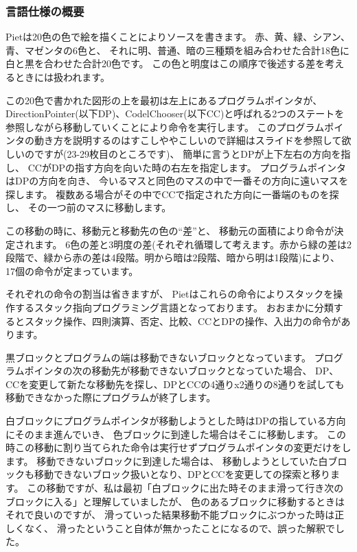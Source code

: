 \subsubsection{言語仕様の概要}

Pietは20色の色で絵を描くことによりソースを書きます。
赤、黄、緑、シアン、青、マゼンタの6色と、
それに明、普通、暗の三種類を組み合わせた合計18色に白と黒を合わせた合計20色です。
この色と明度はこの順序で後述する差を考えるときには扱われます。

この20色で書かれた図形の上を最初は左上にあるプログラムポインタが、
DirectionPointer(以下DP)、CodelChooser(以下CC)と呼ばれる2つのステートを参照しながら移動していくことにより命令を実行します。
このプログラムポインタの動き方を説明するのはすこしややこしいので詳細はスライドを参照して欲しいのですが(23-29枚目のところです)、
簡単に言うとDPが上下左右の方向を指し、
CCがDPの指す方向を向いた時の右左を指定します。
プログラムポインタはDPの方向を向き、
今いるマスと同色のマスの中で一番その方向に遠いマスを探します。
複数ある場合がその中でCCで指定された方向に一番端のものを探し、
その一つ前のマスに移動します。

この移動の時に、移動元と移動先の色の``差''と、
移動元の面積により命令が決定されます。
6色の差と3明度の差(それぞれ循環して考えます。赤から緑の差は2段階で、緑から赤の差は4段階。明から暗は2段階、暗から明は1段階)により、
17個の命令が定まっています。

それぞれの命令の割当は省きますが、
Pietはこれらの命令によりスタックを操作するスタック指向プログラミング言語となっております。
おおまかに分類するとスタック操作、四則演算、否定、比較、CCとDPの操作、入出力の命令があります。

黒ブロックとプログラムの端は移動できないブロックとなっています。
プログラムポインタの次の移動先が移動できないブロックとなっていた場合、
DP、CCを変更して新たな移動先を探し、DPとCCの4通りx2通りの8通りを試しても移動できなかった際にプログラムが終了します。

白ブロックにプログラムポインタが移動しようとした時はDPの指している方向にそのまま進んでいき、
色ブロックに到達した場合はそこに移動します。
この時この移動に割り当てられた命令は実行せずプログラムポインタの変更だけをします。
移動できないブロックに到達した場合は、
移動しようとしていた白ブロックも移動できないブロック扱いとなり、DPとCCを変更しての探索と移ります。
この移動ですが、私は最初「白ブロックに出た時そのまま滑って行き次のブロックに入る」と理解していましたが、
色のあるブロックに移動するときはそれで良いのですが、
滑っていった結果移動不能ブロックにぶつかった時は正しくなく、
滑ったということ自体が無かったことになるので、誤った解釈でした。

